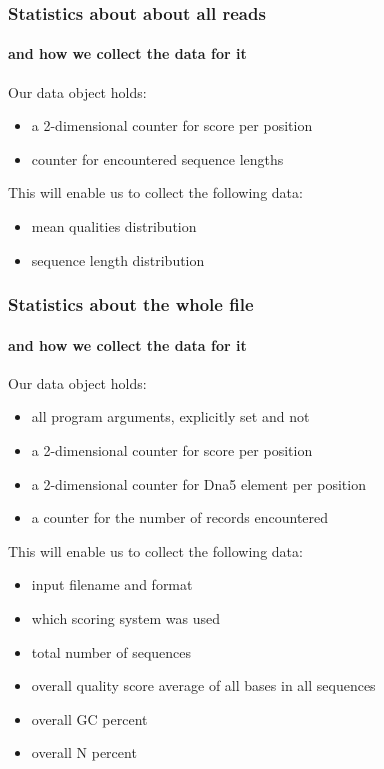 \documentclass{beamer}
\begin{document}
\begin{frame}
 \frametitle{ Statistics about about all reads}
 \framesubtitle{and how we collect the data for it}

Our data object holds:

 \begin{itemize}
  \item a 2-dimensional counter for score per position 
  \item counter for encountered sequence lengths 
 \end{itemize}

This will enable us to collect the following data:
  \begin{itemize}
    \item mean qualities distribution
    \item sequence length distribution
  \end{itemize}
\end{frame}



\begin{frame}
 \frametitle{ Statistics about the whole file}
 \framesubtitle{and how we collect the data for it}

Our data object holds:

 \begin{itemize}
  \item all program arguments, explicitly set and not 
  \item a 2-dimensional counter for score per position 
  \item a 2-dimensional counter for Dna5 element per position 
  \item a counter for the number of records encountered
 \end{itemize}

This will enable us to collect the following data:
\begin{itemize}
 \item   input filename and format
 \item which scoring system was used
 \item   total number of sequences
 \item   overall quality score average of all bases in all sequences
 \item   overall GC percent
 \item   overall N percent
\end{itemize}
\end{frame}
\end{document}
